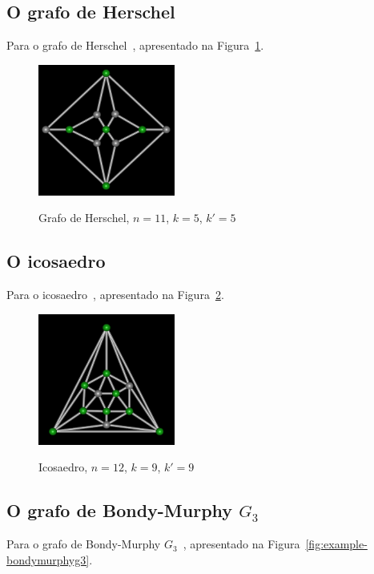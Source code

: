 \subsection{O grafo de Herschel}
Para o grafo de Herschel~\cite{cite:example-herschel},
apresentado na Figura~\ref{fig:example-herschel}.

\begin{figure}[htb]
\centering
\includegraphics[width=0.4\textwidth]{img/herschel.png}
\label{fig:example-herschel}
\caption{Grafo de Herschel, $n=11$, $k=5$, $k'=5$}
\end{figure}


\subsection{O icosaedro}
Para o icosaedro~\cite{cite:example-plato},
apresentado na Figura~\ref{fig:example-icosaedro}.

\begin{figure}[htb]
\centering
\includegraphics[width=0.4\textwidth]{img/icosaedro.png}
\label{fig:example-icosaedro}
\caption{Icosaedro, $n=12$, $k=9$, $k'=9$}
\end{figure}


\subsection{O grafo de Bondy-Murphy $G_3$}
Para o grafo de Bondy-Murphy $G_3$~\cite{cite:example-bondy},
apresentado na Figura~\ref{fig:example-bondymurphyg3}.

